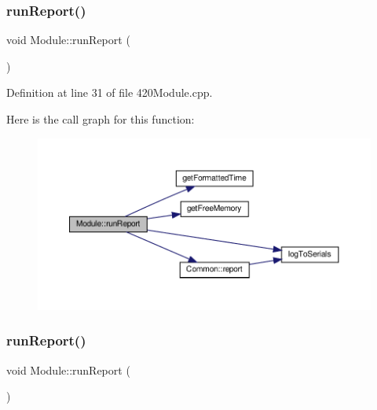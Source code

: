 \subsubsection{\texorpdfstring{run\+Report()}{runReport()}\hspace{0.1cm}{\footnotesize\ttfamily [1/2]}}
{\footnotesize\ttfamily void Module\+::run\+Report (\begin{DoxyParamCaption}{ }\end{DoxyParamCaption})}



Definition at line 31 of file 420\+Module.\+cpp.

Here is the call graph for this function\+:
\nopagebreak
\begin{figure}[H]
\begin{center}
\leavevmode
\includegraphics[width=350pt]{class_module_ab66ea27e8ca0041539f6a563b455ab70_cgraph}
\end{center}
\end{figure}
\mbox{\label{class_module_ab66ea27e8ca0041539f6a563b455ab70}} 
\subsubsection{\texorpdfstring{run\+Report()}{runReport()}\hspace{0.1cm}{\footnotesize\ttfamily [2/2]}}
{\footnotesize\ttfamily void Module\+::run\+Report (\begin{DoxyParamCaption}{ }\end{DoxyParamCaption})}

\mbox{\label{class_module_ace01fc8566dc1d6367560d1ac61c2c18}} 
